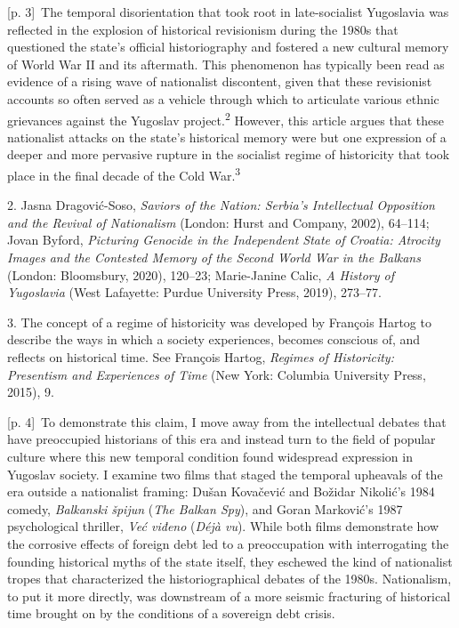 \documentclass[10pt,a4paper]{article}
\begin{document}
{\scriptsize\color{gray} [p. 3]}\ The temporal disorientation that took root in late-socialist Yugoslavia was reflected in the explosion of historical revisionism during the 1980s that questioned the state’s official historiography and fostered a new cultural memory of World War II and its aftermath. This phenomenon has typically been read as evidence of a rising wave of nationalist discontent, given that these revisionist accounts so often served as a vehicle through which to articulate various ethnic grievances against the Yugoslav project.\nobreak\textsuperscript{2} However, this article argues that these nationalist attacks on the state’s historical memory were but one expression of a deeper and more pervasive rupture in the socialist regime of historicity that took place in the final decade of the Cold War.\nobreak\textsuperscript{3}\par{\small 2. Jasna Dragović-Soso, \textit{Saviors of the Nation: Serbia’s Intellectual Opposition and the Revival of Nationalism} (London: Hurst and Company, 2002), 64–114; Jovan Byford, \textit{Picturing Genocide in the Independent State of Croatia: Atrocity Images and the Contested Memory of the Second World War in the Balkans} (London: Bloomsbury, 2020), 120–23; Marie-Janine Calic, \textit{A History of Yugoslavia} (West Lafayette: Purdue University Press, 2019), 273–77.\par}{\small 3. The concept of a regime of historicity was developed by François Hartog to describe the ways in which a society experiences, becomes conscious of, and reflects on historical time. See François Hartog, \textit{Regimes of Historicity: Presentism and Experiences of Time} (New York: Columbia University Press, 2015), 9.\par}
{\scriptsize\color{gray} [p. 4]}\ To demonstrate this claim, I move away from the intellectual debates that have preoccupied historians of this era and instead turn to the field of popular culture where this new temporal condition found widespread expression in Yugoslav society. I examine two films that staged the temporal upheavals of the era outside a nationalist framing: Dušan Kovačević and Božidar Nikolić’s 1984 comedy, \textit{Balkanski špijun} (\textit{The Balkan Spy}), and Goran Marković’s 1987 psychological thriller, \textit{Već viđeno} (\textit{Déjà vu}). While both films demonstrate how the corrosive effects of foreign debt led to a preoccupation with interrogating the founding historical myths of the state itself, they eschewed the kind of nationalist tropes that characterized the historiographical debates of the 1980s. Nationalism, to put it more directly, was downstream of a more seismic fracturing of historical time brought on by the conditions of a sovereign debt crisis.\par
\end{document}
